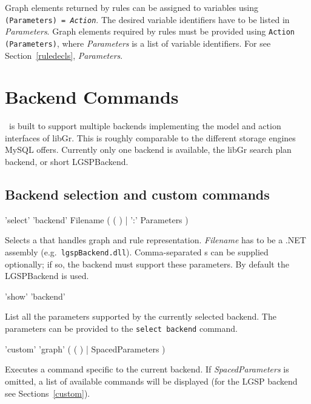 Graph elements returned by rules can be assigned to variables using \texttt{(Para\-meters) = \emph{Action}}. 
The desired variable identifiers have to be listed in \emph{Parameters}. 
Graph elements required by rules must be provided using \texttt{Action (Para\-meters)}, where \emph{Parameters} is a list of variable identifiers. 
For  see Section~\ref{ruledecls}, \emph{Parameters}.


\section{Backend Commands}
\label{backend}

\GrG\ is built to support multiple backends implementing the model and action interfaces of libGr.
This is roughly comparable to the different storage engines MySQL offers.
Currently only one backend is available, the libGr search plan backend, or short LGSPBackend.

\subsection{Backend selection and custom commands}

\begin{rail}
  'select' 'backend' Filename ( ( ) | ':' Parameters )
\end{rail}
Selects a  that handles graph and rule representation.
\emph{Filename} has to be a .NET assembly (e.g.\ \texttt{lgspBackend.dll}).
Comma-separated s can be supplied optionally; if so, the backend must support these parameters.
By default the LGSPBackend is used.

\begin{rail}
  'show' 'backend'
\end{rail}\nopagebreak{}
List all the parameters supported by the currently selected backend.
The parameters can be provided to the \texttt{select backend} command.

\begin{rail}
  'custom' 'graph' ( ( ) | SpacedParameters )
\end{rail}
Executes a command specific to the current backend.
If \emph{SpacedParameters} is omitted, a list of available commands will be displayed (for the LGSP backend see Sections~\ref{custom}).


